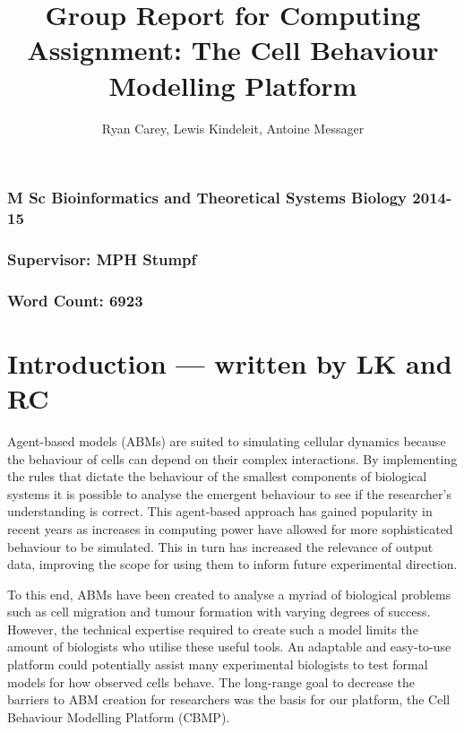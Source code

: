 \documentclass[12pt]{article}
\title{Group Report for Computing Assignment: The Cell Behaviour Modelling Platform}
\author{Ryan Carey, Lewis Kindeleit, Antoine Messager}
\begin{document}
\maketitle
{\centering
\subsubsection*{M Sc Bioinformatics and Theoretical Systems Biology 2014-15}
\subsubsection*{Supervisor: MPH Stumpf} 
\subsubsection*{Word Count: 6923}
}

\newpage
\tableofcontents
\newpage
\section{Introduction --- written by LK and RC} 
Agent-based models (ABMs) are suited to simulating cellular dynamics because the behaviour of cells can 
depend on their complex interactions.\cite{kaul15} By implementing the rules 
that dictate the behaviour of the smallest components of biological systems it is possible to analyse the emergent 
behaviour to see if the researcher’s understanding is correct. This agent-based approach has gained popularity in recent 
years as increases in computing power have allowed for more sophisticated behaviour to be simulated. 
This in turn has increased the relevance of output data, improving the scope for using them to inform 
future experimental direction. \cite{grimm06} \cite{drasdo07}

To this end, ABMs have been created to analyse a myriad of biological problems such as cell migration 
and tumour formation with varying degrees of success. However, the technical expertise required to 
create such a model limits the amount of biologists who utilise these useful tools. An adaptable and 
easy-to-use platform could potentially assist many experimental biologists to test formal models for 
how observed cells behave. The long-range goal to decrease the barriers to  ABM creation for researchers 
was the basis for our platform, the Cell Behaviour Modelling Platform (CBMP).
\end{document}

